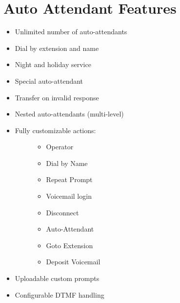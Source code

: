 \documentclass[letterpaper,10pt,english]{sphinxmanual}
\begin{document}
\section{Auto Attendant Features}
\label{\detokenize{features:auto-attendant-features}}\begin{itemize}
\item {} 
Unlimited number of auto-attendants

\item {} 
Dial by extension and name

\item {} 
Night and holiday service

\item {} 
Special auto-attendant

\item {} 
Transfer on invalid response

\item {} 
Nested auto-attendants (multi-level)

\item {} \begin{description}
\item[{Fully customizable actions:}] \leavevmode\begin{itemize}
\item {} 
Operator

\item {} 
Dial by Name

\item {} 
Repeat Prompt

\item {} 
Voicemail login

\item {} 
Disconnect

\item {} 
Auto-Attendant

\item {} 
Goto Extension

\item {} 
Deposit Voicemail

\end{itemize}

\end{description}

\item {} 
Uploadable custom prompts

\item {} 
Configurable DTMF handling

\end{itemize}
\end{document}
